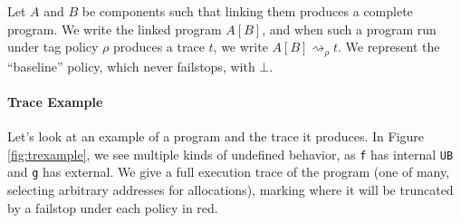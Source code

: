 \documentclass{article}
\begin{document}
Let \(A\) and \(B\) be components such that linking them produces a complete program.
We write the linked program \(A[B]\), and when such a program run under tag
policy \(\rho\) produces a trace \(t\), we write \(A[B] \rightsquigarrow_\rho t\).
We represent the ``baseline'' policy, which never failstops, with \(\bot\).

\paragraph{Trace Example}

Let's look at an example of a program and the trace it produces. In Figure \ref{fig:trexample},
we see multiple kinds of undefined behavior, as {\tt f} has internal {\tt UB} and {\tt g} has
external. We give a full execution trace of the program (one of many, selecting arbitrary addresses
for allocations), marking where it will be truncated by a failstop under each policy in red.
\end{document}
